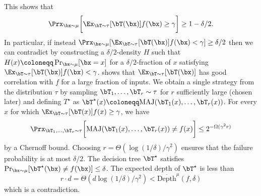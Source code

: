 This shows that
$$
\Prx_{\bx\sim\mu}\bigg[\Ex_{\bT\sim\tau}[\bT(\bx)]f(\bx)\ge \gamma\bigg]\ge 1-\delta/2.
$$
In particular, if instead $\Prx_{\bx\sim\mu}[\Ex_{\bT\sim\tau}[\bT(\bx)]f(\bx)<\gamma]\ge \delta/2$ then we can contradict  by constructing a $\delta/2$-density $H$ such that $H(x)\coloneqq\Pr_{\bx\sim\mu}[\bx=x]$ for a $\delta/2$-fraction of $x$ satisfying $\Ex_{\bT\sim\tau}[\bT(\bx)]f(\bx)< \gamma$.  shows that $\Ex_{\bT\sim\tau}[\bT(\bx)]$ has good correlation with $f$ for a large fraction of inputs. We obtain a single strategy from the distribution $\tau$ by sampling $\bT_1,\ldots,\bT_r\sim\tau$ for $r$ sufficiently large (chosen later) and defining $T^\star$ as $\bT^{\star}(x)\coloneqq \text{MAJ}(\bT_1(x),\ldots,\bT_r(x))$.
For every $x$ for which $\Ex_{\bT\sim\tau}[\bT(x)]f(x)\ge \gamma$, we have
$$
\Prx_{\bT_1,\ldots,\bT_r\sim\tau}\bigg[\text{MAJ}(\bT_1(x),\ldots,\bT_r(x))\neq f(x)\bigg]\le 2^{-\Omega(\gamma^2 r)}
$$
by a Chernoff bound. Choosing $r=\Theta(\log(1/\delta)/\gamma^2)$ ensures that the failure probability is at most $\delta/2$. The decision tree $\bT^{\star}$ satisfies $\Pr_{\bx\sim\mu}[\bT^\star(\bx)\neq f(\bx)]\le \delta$. The expected depth of $\bT^\star$ is less than
$$
r\cdot d=\Theta(d\log (1/\delta)/\gamma^2)<\overline{\mathrm{Depth}}^\mu(f,\delta)
$$
which is a contradiction.

